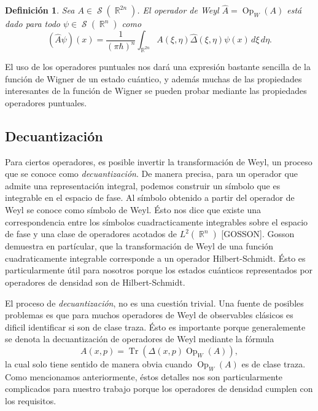 \documentclass[a4paper]{report}
\DeclareMathOperator{\R}{\mathbb{R}}
\DeclareMathOperator{\Sz}{\mathcal S}
\DeclareMathOperator{\Tr}{Tr}
\DeclareMathOperator{\Op}{Op}
\newtheorem{definition}{Definición}
\begin{document}
  \begin{definition}
    Sea $A \in \Sz(\R^{2n})$. El operador de Weyl $\hat{A} =
    \Op_W(A)$ está dado para todo $\psi \in \Sz(\R^{n})$ 
    como
    \begin{equation}
      \left( \hat{A}\psi \right)(x)
      = \frac{1}{(\pi\hbar)^{n}} \int_{\R^{2n}}
      A(\xi,\eta)\hat{\Delta}(\xi,\eta)\psi(x) \, d\xi \,
      d\eta.
    \end{equation}
  \end{definition}

  El uso de los operadores puntuales nos dará una expresión
  bastante sencilla de la función de Wigner de un estado
  cuántico, y además muchas de las propiedades interesantes
  de la función de Wigner se pueden probar mediante
  las propiedades operadores puntuales.

  \subsection{Decuantización}

  Para ciertos operadores, es posible invertir la
  transformación de Weyl, un proceso que se conoce como
  \textit{decuantización}. De manera precisa, para un
  operador que admite una representación integral, podemos
  construir un símbolo que es integrable en el espacio de
  fase. Al símbolo obtenido a partir del operador de Weyl se
  conoce como símbolo de Weyl. Ésto nos dice que existe una
  correspondencia entre los símbolos cuadracticamente
  integrables sobre el espacio de fase y una clase de
  operadores acotados de $L^2(\R^{n})$ [GOSSON]. Gosson
  demuestra en partícular, que la transformación de Weyl de
  una función cuadraticamente integrable corresponde a un
  operador Hilbert-Schmidt. Ésto es particularmente útil
  para nosotros porque los estados cuánticos representados
  por operadores de densidad son de Hilbert-Schmidt.

  El proceso de \textit{decuantización}, no es una cuestión
  trivial. Una fuente de posibles problemas es que para
  muchos operadores de Weyl de observables clásicos es
  dificil identificar si son de clase traza. Ésto es
  importante porque generalemente se denota la
  decuantización de operadores de Weyl mediante la fórmula
  \[
    A(x,p)
    = \Tr\left( \Delta(x,p) \Op_W(A) \right),
  \] 
  la cual solo tiene sentido de manera obvia cuando
  $\Op_W(A)$ es de clase traza. Como mencionamos
  anteriormente, éstos detalles nos son particularmente
  complicados para nuestro trabajo porque los operadores de
  densidad cumplen con los requisitos.
\end{document}
